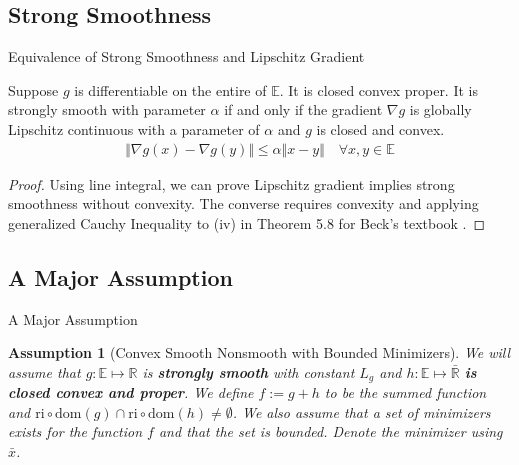 \documentclass[11pt]{beamer}
\newtheorem{assumption}{Assumption}
\begin{document}
        
    \subsection{Strong Smoothness}
        \begin{frame}{Equivalence of Strong Smoothness and Lipschitz Gradient}
            \begin{theorem}
                Suppose $g$ is differentiable on the entire of $\mathbb E$. It is closed convex proper. It is strongly smooth with parameter $\alpha$ if and only if the gradient $\nabla g$ is globally Lipschitz continuous with a parameter of $\alpha$ and $g$ is closed and convex. 
                \begin{align*}
                    \Vert \nabla g(x) -\nabla g(y)\Vert \le 
                    \alpha 
                    \Vert x - y \Vert\quad \forall x, y\in \mathbb E
                \end{align*}
            \end{theorem}
            \begin{proof}
                Using line integral, we can prove Lipschitz gradient implies strong smoothness without convexity. The converse requires convexity and applying generalized Cauchy Inequality to (iv) in Theorem 5.8 for Beck's textbook \cite{book:first_order_opt}. 
            \end{proof}
            
        \end{frame}
    \subsection{A Major Assumption}    
        \begin{frame}{A Major Assumption}
            \begin{assumption}[Convex Smooth Nonsmooth with Bounded Minimizers]\label{assumption:1}
                We will assume that $g:\mathbb E\mapsto \mathbb R$ is \textbf{strongly smooth} with constant $L_g$ and $h:\mathbb E \mapsto \bar{\mathbb R}$ \textbf{is closed convex and proper}. We define $f := g + h$ to be the summed function and $\text{ri}\circ \text{dom}(g) \cap \text{ri}\circ \text{dom}(h) \neq \emptyset$. We also assume that a set of minimizers exists for the function $f$ and that the set is bounded. Denote the minimizer using $\bar x$. 
            \end{assumption}
        \end{frame}
        
\end{document}
